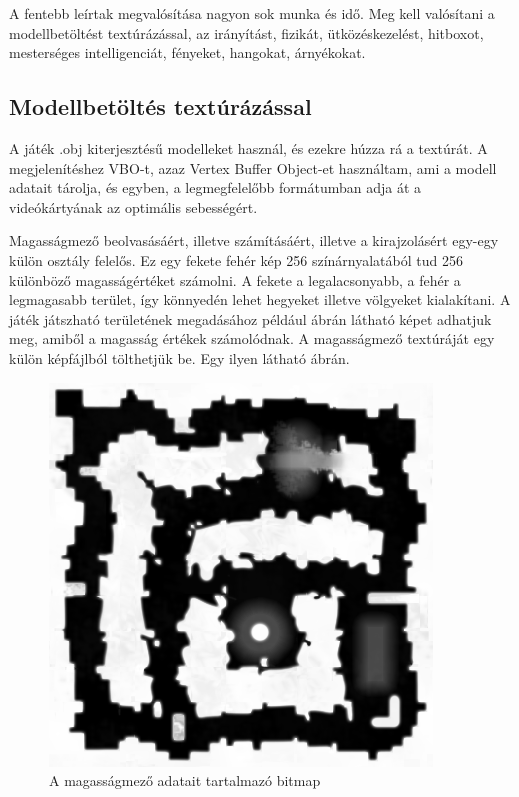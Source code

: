 A fentebb leírtak megvalósítása nagyon sok munka és idő. Meg kell valósítani a modellbetöltést textúrázással, az irányítást, fizikát, ütközéskezelést, hitboxot, mesterséges intelligenciát, fényeket, hangokat, árnyékokat.

\subsection{Modellbetöltés textúrázással}

A játék .obj kiterjesztésű modelleket használ, és ezekre húzza rá a textúrát. A megjelenítéshez VBO-t, azaz Vertex Buffer Object-et használtam, ami a modell adatait tárolja, és egyben, a legmegfelelőbb formátumban adja át a videókártyának az optimális sebességért.

Magasságmező beolvasásáért, illetve számításáért, illetve a kirajzolásért egy-egy külön osztály felelős. Ez egy fekete fehér kép 256 színárnyalatából tud 256 különböző magasságértéket számolni. A fekete a legalacsonyabb, a fehér a legmagasabb terület, így könnyedén lehet hegyeket illetve völgyeket kialakítani. A játék játszható területének megadásához például  ábrán látható képet adhatjuk meg, amiből a magasság értékek számolódnak. A magasságmező textúráját egy külön képfájlból tölthetjük be. Egy ilyen látható  ábrán.

\begin{figure}[h]
\centering
\includegraphics[scale=0.7]{kepek/heightmap.png}
\caption{A magasságmező adatait tartalmazó bitmap}
\label{fig:heightmap}
\end{figure}

